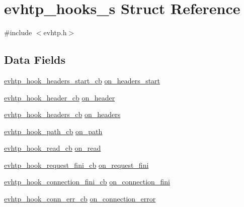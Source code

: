 \hypertarget{structevhtp__hooks__s}{\section{evhtp\-\_\-hooks\-\_\-s Struct Reference}
\label{structevhtp__hooks__s}
}


{\ttfamily \#include $<$evhtp.\-h$>$}

\subsection*{Data Fields}
\begin{DoxyCompactItemize}
\item 
\hyperlink{evhtp_8h_a8617dcbd408016b4ca88e81f7eaedfc8}{evhtp\-\_\-hook\-\_\-headers\-\_\-start\-\_\-cb} \hyperlink{structevhtp__hooks__s_a3a26790aee39951ecdb3ff99d50624b0}{on\-\_\-headers\-\_\-start}
\item 
\hyperlink{evhtp_8h_ab2652e7b3a9c89a7b73c53edcedba963}{evhtp\-\_\-hook\-\_\-header\-\_\-cb} \hyperlink{structevhtp__hooks__s_a3062e8d2a83147219affa3c69ef3abfe}{on\-\_\-header}
\item 
\hyperlink{evhtp_8h_a1d51ae638968fbe2197b30d8d8be30fc}{evhtp\-\_\-hook\-\_\-headers\-\_\-cb} \hyperlink{structevhtp__hooks__s_a0afaaf69ca2cb4386475120fbff830f8}{on\-\_\-headers}
\item 
\hyperlink{evhtp_8h_a74a2a8a43947a0e401d11726d3cc0bc7}{evhtp\-\_\-hook\-\_\-path\-\_\-cb} \hyperlink{structevhtp__hooks__s_a955ae840d237ccd632bd47e2ffe74908}{on\-\_\-path}
\item 
\hyperlink{evhtp_8h_a063a81c3e02b9ef58b9d1f625e0d9be2}{evhtp\-\_\-hook\-\_\-read\-\_\-cb} \hyperlink{structevhtp__hooks__s_a03ab0478633f5599bd5630a3a93c4add}{on\-\_\-read}
\item 
\hyperlink{evhtp_8h_ad89ca042507f5369e920f542be8f98dd}{evhtp\-\_\-hook\-\_\-request\-\_\-fini\-\_\-cb} \hyperlink{structevhtp__hooks__s_a6ac6a986b72cd6ddb313d5473b24a775}{on\-\_\-request\-\_\-fini}
\item 
\hyperlink{evhtp_8h_a50c0b59a1e60180fc87ab8125141d26c}{evhtp\-\_\-hook\-\_\-connection\-\_\-fini\-\_\-cb} \hyperlink{structevhtp__hooks__s_ab5055f169a8bd03bf41956a7e4cd752d}{on\-\_\-connection\-\_\-fini}
\item 
\hyperlink{evhtp_8h_ae45dc22dbf98bf6977156ac6b35a4263}{evhtp\-\_\-hook\-\_\-conn\-\_\-err\-\_\-cb} \hyperlink{structevhtp__hooks__s_a5f0da26e38c833256a844a9652733ae8}{on\-\_\-connection\-\_\-error}
\item 

\end{DoxyCompactItemize}
